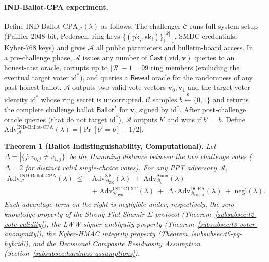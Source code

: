 \paragraph{IND-Ballot-CPA experiment.} Define $\mathrm{IND\text{-}Ballot\text{-}CPA}_{\mathcal{A}}(\lambda)$ as follows. The challenger $\mathcal{C}$ runs full system setup (Paillier 2048-bit, Pedersen, ring keys $\{(\text{pk}_i, \text{sk}_i)\}_{i=1}^{|\mathcal{R}|}$, SMDC credentials, Kyber-768 keys) and gives $\mathcal{A}$ all public parameters and bulletin-board access. In a pre-challenge phase, $\mathcal{A}$ issues any number of $\mathsf{Cast}(\text{vid}, \mathbf{v})$ queries to an honest-cast oracle, corrupts up to $|\mathcal{R}| - 1 = 99$ ring members (excluding the eventual target voter $\text{id}^*$), and queries a $\mathsf{Reveal}$ oracle for the randomness of any past honest ballot. $\mathcal{A}$ outputs two valid vote vectors $\mathbf{v}_0, \mathbf{v}_1$ and the target voter identity $\text{id}^*$ whose ring secret is uncorrupted. $\mathcal{C}$ samples $b \stackrel{\$}{\leftarrow} \{0,1\}$ and returns the complete challenge ballot $\mathsf{Ballot}^*$ for $\mathbf{v}_b$ signed by $\text{id}^*$. After post-challenge oracle queries (that do not target $\text{id}^*$), $\mathcal{A}$ outputs $b'$ and wins if $b' = b$. Define $\mathrm{Adv}^{\mathrm{IND\text{-}Ballot\text{-}CPA}}_{\mathcal{A}}(\lambda) = |\Pr[b' = b] - 1/2|$.

\textbf{Theorem 1 (Ballot Indistinguishability, Computational).} \textit{Let $\Delta = |\{j : v_{0,j} \neq v_{1,j}\}|$ be the Hamming distance between the two challenge votes ($\Delta = 2$ for distinct valid single-choice votes). For any PPT adversary $\mathcal{A}$,}
\begin{equation}
\begin{aligned}
    \mathrm{Adv}^{\mathrm{IND\text{-}Ballot\text{-}CPA}}_{\mathcal{A}}(\lambda) \;\leq\; & \mathrm{Adv}^{\mathrm{ZK}}_{\mathcal{B}_{\text{ZK}}}(\lambda) \;+\; \mathrm{Adv}^{\mathrm{Anon}}_{\mathcal{B}_{\sigma}}(\lambda) \\
    & +\; \mathrm{Adv}^{\mathrm{INT\text{-}CTXT}}_{\mathcal{B}_{\text{Hyb}}}(\lambda) \;+\; \Delta \cdot \mathrm{Adv}^{\mathrm{DCRA}}_{\mathcal{B}_{\mathrm{DCRA}}}(\lambda) \;+\; \mathrm{negl}(\lambda).
\end{aligned}
    \label{eq:t1-bound}
\end{equation}
\textit{Each advantage term on the right is negligible under, respectively, the zero-knowledge property of the Strong-Fiat-Shamir $\Sigma$-protocol (Theorem~\ref{subsubsec:t2-vote-validity}), the LWW signer-ambiguity property (Theorem~\ref{subsubsec:t3-voter-anonymity}), the Kyber-HMAC integrity property (Theorem~\ref{subsubsec:t6-pq-hybrid}), and the Decisional Composite Residuosity Assumption (Section~\ref{subsubsec:hardness-assumptions}).}

